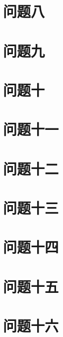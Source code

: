 \documentclass[fontset=windowsnew,zihao=-4,scheme=chinese,punct=quanjiao,linespread=1,UTF8]{ctexart}
\begin{document}
\section{问题八}

\section{问题九}

\section{问题十}

\section{问题十一}

\section{问题十二}

\section{问题十三}

\section{问题十四}

\section{问题十五}

\section{问题十六}

\end{document}
